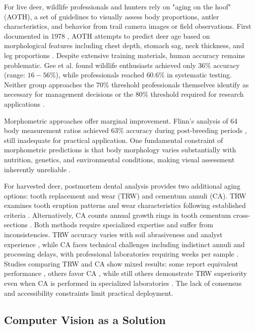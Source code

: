 \documentclass{iopjournal}
\begin{document}
For live deer, wildlife professionals and hunters rely on "aging on the hoof" (AOTH), a set of guidelines to visually assess body proportions, antler characteristics, and behavior from trail camera images or field observations. First documented in 1978 \cite{1978knowlton}, AOTH attempts to predict deer age based on morphological features including chest depth, stomach sag, neck thickness, and leg proportions \cite{1996kroll, 1999demarais, 2003richards, 2008hellickson}. Despite extensive training materials, human accuracy remains problematic. Gee et al. \cite{2013gee} found wildlife enthusiasts achieved only $36\%$ accuracy (range: $16-56\%$), while professionals reached $60.6\%$ in systematic testing. Neither group approaches the $70\%$ threshold professionals themselves identify as necessary for management decisions or the $80\%$ threshold required for research applications \cite{2013gee}.

Morphometric approaches offer marginal improvement. Flinn's analysis of 64 body measurement ratios achieved $63\%$ accuracy during post-breeding periods \cite{2010flinn}, still inadequate for practical application. One fundamental constraint of morphometric predictions is that body morphology varies substantially with nutrition, genetics, and environmental conditions, making visual assessment inherently unreliable \cite{2013gee}.

For harvested deer, postmortem dental analysis provides two additional aging options: tooth replacement and wear (TRW) and cementum annuli (CA). TRW examines tooth eruption patterns and wear characteristics following established criteria \cite{1949severinghaus, 1980larson}. Alternatively, CA counts annual growth rings in tooth cementum cross-sections \cite{1949severinghaus, 1963low, 1966ransom, 1966gilbert}. Both methods require specialized expertise and suffer from inconsistencies. TRW accuracy varies with soil abrasiveness and analyst experience \cite{1967ludwig, 1979cook, 2000hamlin}, while CA faces technical challenges including indistinct annuli and processing delays, with professional laboratories requiring weeks per sample \cite{2012nda}. Studies comparing TRW and CA show mixed results: some report equivalent performance \cite{1989jacobson}, others favor CA \cite{2000hamlin, 2013cooper}, while still others demonstrate TRW superiority even when CA is performed in specialized laboratories \cite{1979cook}. The lack of consensus and accessibility constraints limit practical deployment.

\subsection{Computer Vision as a Solution}
\end{document}
